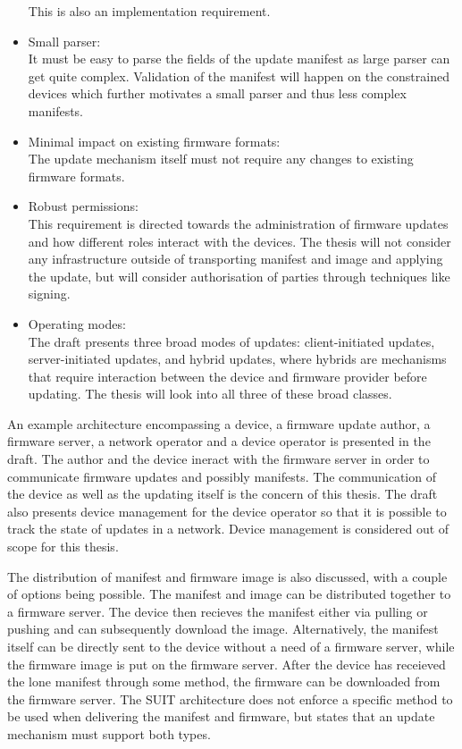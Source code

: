 \documentclass[0-thesis.tex]{subfiles}
\begin{document}
\begin{itemize}
            This is also an implementation requirement. %
    \item Small parser:\\
            It must be easy to parse the fields of the update manifest as large parser can 
            get quite complex. Validation of the manifest will happen on the constrained 
            devices which further motivates a small parser and thus less complex manifests.
    \item Minimal impact on existing firmware formats:\\
            The update mechanism itself must not require any changes to existing firmware 
            formats. %
    \item Robust permissions:\\
            This requirement is directed towards the administration of firmware updates and 
            how different roles interact with the devices. The thesis will not consider any 
            infrastructure outside of transporting manifest and image and  applying 
            the update, but will consider authorisation of parties through techniques like 
            signing.
    \item Operating modes:\\
            The draft presents three broad modes of updates: client-initiated updates, 
            server-initiated updates, and hybrid updates, where hybrids are mechanisms 
            that require interaction between the device and firmware provider before 
            updating. The thesis will look into all three of these broad classes.
\end{itemize}

An example architecture encompassing a device, a firmware update author, a firmware server,
a network operator and a device operator is presented in the draft. The author and the device 
ineract with the firmware server in order to communicate firmware updates and possibly 
manifests. The communication of the device as well as the updating itself is the concern 
of this thesis. The draft also presents device management for the device operator so that 
it is possible to track the state of updates in a network. Device management is considered 
out of scope for this thesis.

The distribution of manifest and firmware image is also discussed, with a couple of options 
being possible. The manifest and image can be distributed together to a firmware server. 
The device then recieves the manifest either via pulling or pushing and can subsequently download
the image. Alternatively, the manifest itself can be directly sent to the device without a 
need of a firmware server, while the firmware image is put on the firmware server. After the 
device has receieved the lone manifest through some method, the firmware can be downloaded 
from the firmware server. The SUIT architecture does not enforce a specific method to be used 
when delivering the manifest and firmware, but states that an update mechanism must support 
both types.
\end{document}
